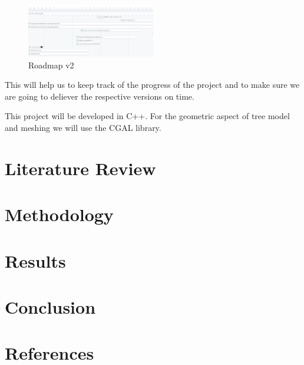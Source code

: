 \documentclass[12pt]{article}
\begin{document}
\begin{figure}[H]
    \centering
    \includegraphics[width=0.5\textwidth]{images/roadmap_v2.png}
    \caption{Roadmap v2}
\end{figure}

This will help us to keep track of the progress of the project and to make sure
we are going to deliever the respective versions on time.

This project will be developed in C++.
For the geometric aspect of tree model and meshing we will use the CGAL library.

\newpage
\section{Literature Review}

\newpage

\section{Methodology}

\newpage

\section{Results}

\newpage

\section{Conclusion}

\newpage

\section{References}


\end{document}
